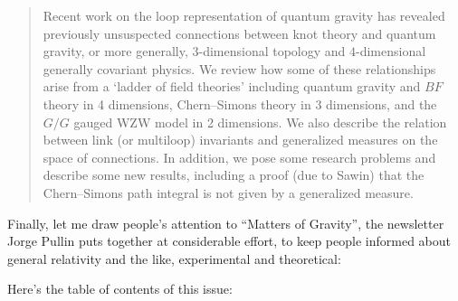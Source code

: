 \documentclass{article}
\def\tightlist{}
\renewcommand{\texttt}[1]{%
  \begingroup
  \ttfamily
  \begingroup\lccode`~=`/\lowercase{\endgroup\def~}{/\discretionary{}{}{}}%
  \begingroup\lccode`~=`[\lowercase{\endgroup\def~}{[\discretionary{}{}{}}%
  \begingroup\lccode`~=`.\lowercase{\endgroup\def~}{.\discretionary{}{}{}}%
  \catcode`/=\active\catcode`[=\active\catcode`.=\active
  \scantokens{#1\noexpand}%
  \endgroup
}
\begin{document}
\begin{quote}
Recent work on the loop representation of quantum gravity has revealed
previously unsuspected connections between knot theory and quantum
gravity, or more generally, \(3\)-dimensional topology and
\(4\)-dimensional generally covariant physics. We review how some of
these relationships arise from a `ladder of field theories' including
quantum gravity and \(BF\) theory in 4 dimensions, Chern--Simons theory
in 3 dimensions, and the \(G/G\) gauged WZW model in 2 dimensions. We
also describe the relation between link (or multiloop) invariants and
generalized measures on the space of connections. In addition, we pose
some research problems and describe some new results, including a proof
(due to Sawin) that the Chern--Simons path integral is not given by a
generalized measure.
\end{quote}

Finally, let me draw people's attention to ``Matters of Gravity'', the
newsletter Jorge Pullin puts together at considerable effort, to keep
people informed about general relativity and the like, experimental and
theoretical:


Here's the table of contents of this issue:
\end{document}

